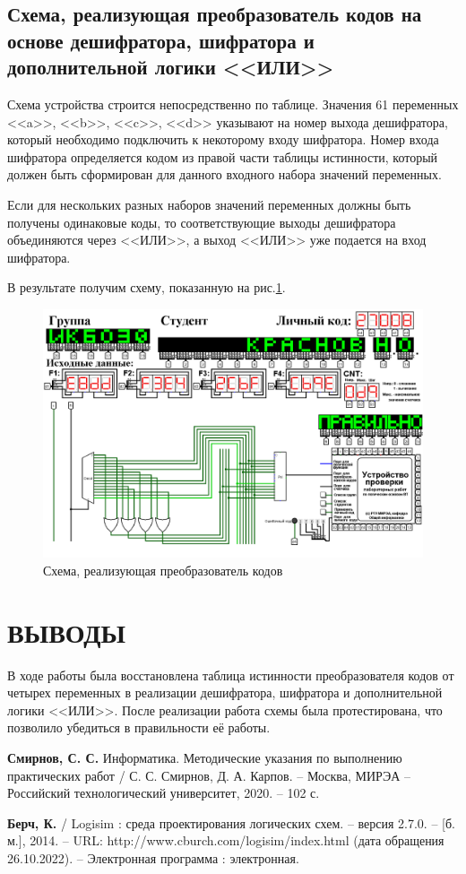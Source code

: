 \documentclass{mirea}
\begin{document}
\section{Схема, реализующая преобразователь кодов на основе дешифратора, шифратора и дополнительной логики <<ИЛИ>>}

Схема устройства строится непосредственно по таблице. Значения 61 переменных <<a>>, <<b>>, <<c>>, <<d>> указывают на номер выхода дешифратора, который необходимо подключить к некоторому входу шифратора. Номер входа шифратора определяется кодом из правой части таблицы истинности, который должен быть сформирован для данного входного набора значений переменных.

Если для нескольких разных наборов значений переменных должны быть получены одинаковые коды, то соответствующие выходы дешифратора объединяются через <<ИЛИ>>, а выход <<ИЛИ>> уже подается на вход шифратора.

В результате получим схему, показанную на рис.\ref{fig:Преобразователь}.

\begin{figure}[ht]
	\centering
	\includegraphics[width=\textwidth]{Преобразователь кодов.png}
	\caption{Схема, реализующая преобразователь кодов}
	\label{fig:Преобразователь}
\end{figure}

\chapter{ВЫВОДЫ}
В ходе работы была восстановлена таблица истинности преобразователя кодов от четырех переменных в реализации дешифратора, шифратора и дополнительной логики <<ИЛИ>>. После реализации работа схемы была протестирована, что позволило убедиться в правильности её работы.

\begin{thebibliography}{99}
	 \textbf{Смирнов, С. С.} Информатика. Методические указания по выполнению практических работ / С. С. Смирнов, Д. А. Карпов. – Москва, МИРЭА – Российский технологический университет, 2020. – 102 с.
	
	 \textbf{Берч, К.} / Logisim : среда проектирования логических схем. -- версия 2.7.0. -- [б. м.], 2014. -- URL: http://www.cburch.com/logisim/index.html (дата обращения 26.10.2022). -- Электронная программа : электронная.
\end{thebibliography}
\end{document}
